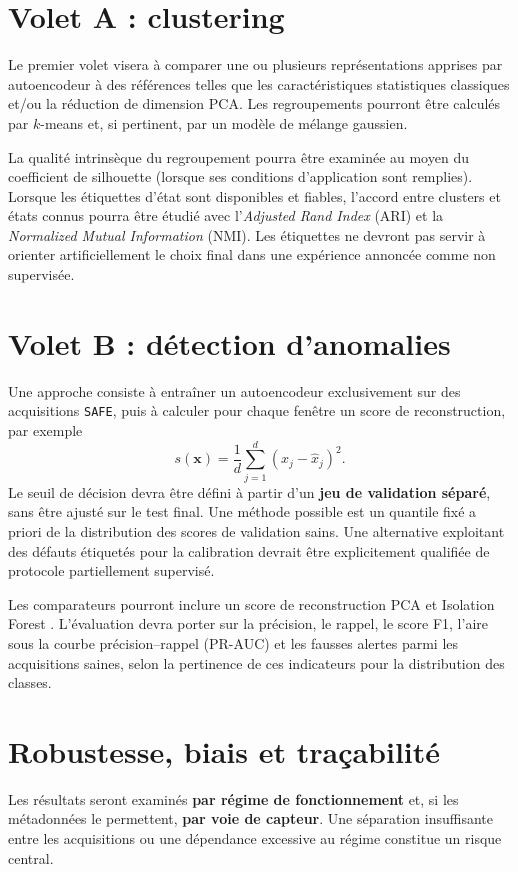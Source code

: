 \section{Volet A : clustering}
Le premier volet visera à comparer une ou plusieurs représentations apprises par autoencodeur à des références telles que les caractéristiques statistiques classiques et/ou la réduction de dimension PCA. Les regroupements pourront être calculés par $k$-means et, si pertinent, par un modèle de mélange gaussien.

La qualité intrinsèque du regroupement pourra être examinée au moyen du coefficient de silhouette (lorsque ses conditions d'application sont remplies). Lorsque les étiquettes d'état sont disponibles et fiables, l'accord entre clusters et états connus pourra être étudié avec l'\emph{Adjusted Rand Index} (ARI) et la \emph{Normalized Mutual Information} (NMI). Les étiquettes ne devront pas servir à orienter artificiellement le choix final dans une expérience annoncée comme non supervisée.

\section{Volet B : détection d'anomalies}
Une approche consiste à entraîner un autoencodeur exclusivement sur des acquisitions \texttt{SAFE}, puis à calculer pour chaque fenêtre un score de reconstruction, par exemple
\begin{equation}
  s(\mathbf{x})=\frac{1}{d}\sum_{j=1}^{d}(x_j-\hat{x}_j)^2.
  \label{eq:score}
\end{equation}
Le seuil de décision devra être défini à partir d'un \textbf{jeu de validation séparé}, sans être ajusté sur le test final. Une méthode possible est un quantile fixé a priori de la distribution des scores de validation sains. Une alternative exploitant des défauts étiquetés pour la calibration devrait être explicitement qualifiée de protocole partiellement supervisé.

Les comparateurs pourront inclure un score de reconstruction PCA et Isolation Forest \cite{liu2008}. L'évaluation devra porter sur la précision, le rappel, le score F1, l'aire sous la courbe précision--rappel (PR-AUC) et les fausses alertes parmi les acquisitions saines, selon la pertinence de ces indicateurs pour la distribution des classes.

\section{Robustesse, biais et traçabilité}
Les résultats seront examinés \textbf{par régime de fonctionnement} et, si les métadonnées le permettent, \textbf{par voie de capteur}. Une séparation insuffisante entre les acquisitions ou une dépendance excessive au régime constitue un risque central.

